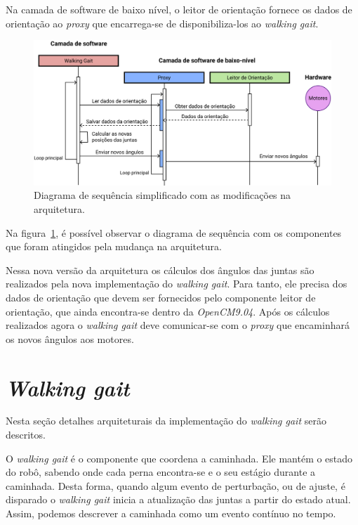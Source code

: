 Na camada de software de baixo nível, o leitor de orientação fornece os dados de orientação ao \textit{proxy} que encarrega-se de disponibiliza-los ao \textit{walking gait}.

\begin{figure}[h!]
	\centering
	\includegraphics[scale=1]{imagens/svg/softwarearchitecture-newproposal-sequence}
	\caption{Diagrama de sequência simplificado com as modificações na arquitetura.}
	\label{fig:softwarearchitecture:newproposal:sequence}
\end{figure}

Na figura~\ref{fig:softwarearchitecture:newproposal:sequence}, é possível observar o diagrama de sequência com os componentes que foram atingidos pela mudança na arquitetura.

Nessa nova versão da arquitetura os cálculos dos ângulos das juntas são realizados pela nova implementação do \textit{walking gait}. Para tanto, ele precisa dos dados de orientação que devem ser fornecidos pelo componente leitor de orientação, que ainda encontra-se dentro da \textit{OpenCM9.04}. Após os cálculos realizados agora o \textit{walking gait} deve comunicar-se com o \textit{proxy} que encaminhará os novos ângulos aos motores.

\section{\textit{Walking gait}}

Nesta seção detalhes arquiteturais da implementação do \textit{walking gait} serão descritos.

O \textit{walking gait} é o componente que coordena a caminhada. Ele mantém o estado do robô, sabendo onde cada perna encontra-se e o seu estágio durante a caminhada. Desta forma, quando algum evento de perturbação, ou de ajuste, é disparado o \textit{walking gait} inicia a atualização das juntas a partir do estado atual. Assim, podemos descrever a caminhada como um evento contínuo no tempo.


